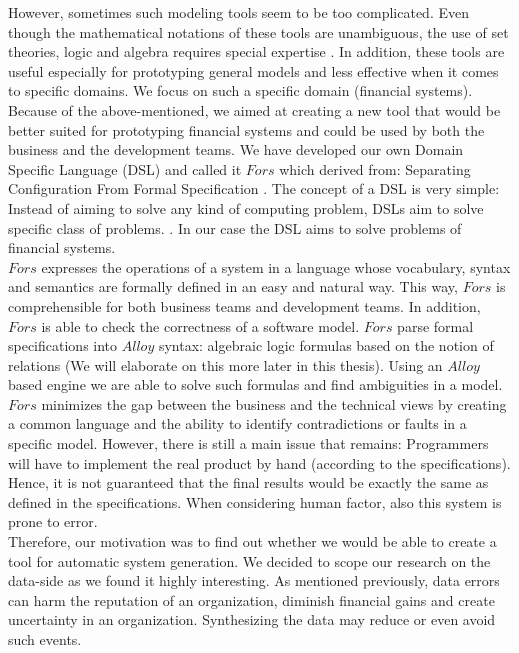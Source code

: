 \documentclass[oneside]{book}
\begin{document}
However, sometimes such modeling tools seem to be too complicated. Even though the mathematical notations of these tools are unambiguous, the use of set theories, logic and algebra requires special expertise \cite[p.~10]{fors}. In addition, these tools are useful especially for prototyping general models and less effective when it comes to specific domains. We focus on such a specific domain (financial systems). \\

Because of the above-mentioned, we aimed at creating a new tool that would be better suited for prototyping financial systems and could be used by both the business and the development teams. We have developed our own Domain Specific Language (DSL) and called it $Fors$ which derived from: Separating Configuration From Formal Specification \cite{fors}. The concept of a DSL is very simple: Instead of aiming to solve any kind of computing problem, DSLs aim to solve specific class of problems. \cite{dsl}. In our case the DSL aims to solve problems of financial systems.  \\

$Fors$ expresses the operations of a system in a language whose vocabulary, syntax and semantics are formally defined in an easy and natural way. This way, $Fors$ is comprehensible for both business teams and development teams. In addition, $Fors$ is able to check the correctness of a software model. $Fors$ parse formal specifications into $Alloy$ syntax: algebraic logic formulas based on the notion of relations (We will elaborate on this more later in this thesis). Using an $Alloy$ based engine we are able to solve such formulas and find ambiguities in a model. \\

$Fors$ minimizes the gap between the business and the technical views by creating a common language and the ability to identify contradictions or faults in a specific model. However, there is still a main issue that remains: Programmers will have to implement the real product by hand (according to the specifications). Hence, it is not guaranteed that the final results would be exactly the same as defined in the specifications. When considering human factor, also this system is prone to error. \\

Therefore, our motivation was to find out whether we would be able to create a tool for automatic system generation. We decided to scope our research on the data-side as we found it highly interesting. As mentioned previously, data errors can harm the reputation of an organization, diminish financial gains and create uncertainty in an organization. Synthesizing the data may reduce or even avoid such events.\\
\end{document}
